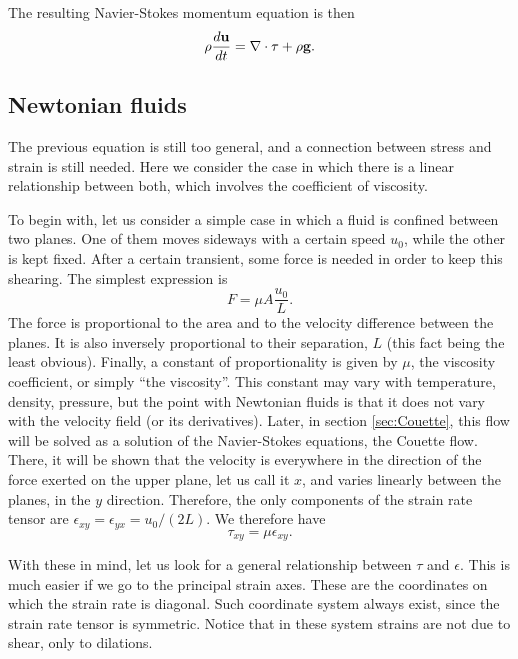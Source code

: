 The resulting Navier-Stokes momentum equation is then
\begin{equation}
  \label{eq:NS}
  \rho \frac{d\mathbf{u} }{dt} = \nabla \cdot \tau   + \rho \mathbf{g} .
\end{equation}



\subsection{Newtonian fluids}
\label{sec:Newtonian}

The previous equation is still too general, and a connection between
stress and strain is still needed. Here we consider the case in which
there is a linear relationship between both, which involves the
coefficient of viscosity.

To begin with, let us consider a simple case in which a fluid is
confined between two planes. One of them moves sideways with a certain
speed $u_0$, while the other is kept fixed. After a certain transient,
some force is needed in order to keep this shearing. The simplest
expression is
\begin{equation}\label{eq:Newton_simple_law}
F= \mu A \frac{u_0}{L} .
\end{equation}
The force is proportional to the area and to the velocity difference
between the planes. It is also inversely proportional to their
separation, $L$ (this fact being the least obvious). Finally, a
constant of proportionality is given by $\mu$, the viscosity
coefficient, or simply ``the viscosity''. This constant may vary with
temperature, density, pressure, but the point with Newtonian fluids is
that it does not vary with the velocity field (or its
derivatives). Later, in section \ref{sec:Couette}, this flow will be
solved as a solution of the Navier-Stokes equations, the Couette
flow. There, it will be shown that the velocity is everywhere in the
direction of the force exerted on the upper plane, let us call it $x$,
and varies linearly between the planes, in the $y$
direction. Therefore, the only components of the strain rate tensor
are $\epsilon_{xy} = \epsilon_{yx} = u_0 / ( 2 L )$. We therefore have
\[
\tau_{xy} = \mu  \epsilon_{xy} .
\]

With these in mind, let us look for a general relationship between
$\tau$ and $\epsilon$. This is much easier if we go to the principal
strain axes. These are the coordinates on which the strain rate is
diagonal. Such coordinate system always exist, since the strain rate
tensor is symmetric. Notice that in these system strains are not due to
shear, only to dilations.

